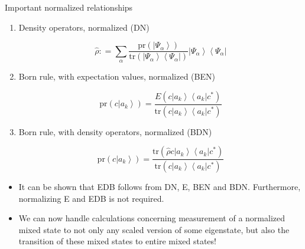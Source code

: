 \documentclass[9pt,handout]{beamer}
\newcommand{\pr}[0]{\text{pr}}
\newcommand{\tr}[0]{\text{tr}}
\begin{document}
\begin{frame}{}
\begin{block}{Important normalized relationships}
\begin{enumerate}
\item Density operators, normalized (DN)

$$\widehat{\rho} : = \sum_\alpha \frac{\pr \left( \left\lvert \Psi_\alpha \right\rangle \right)}{\tr \left( \left\lvert \Psi_\alpha \right\rangle \left\langle \Psi_\alpha \right\rvert \right)} \left\lvert \Psi_\alpha \right\rangle \left\langle \Psi_\alpha \right\rvert$$

\item Born rule, with expectation values, normalized (BEN)

$$\pr \left( c \left\lvert a_k \right\rangle \right) = \frac{E \left( c \left\lvert a_k \right\rangle \left\langle a_k \right\rvert c^* \right)}{\tr \left( c \left\lvert a_k \right\rangle \left\langle a_k \right\rvert c^* \right)}$$

\item Born rule, with density operators, normalized (BDN)

$$\pr \left( c \left\lvert a_k \right\rangle \right) = \frac{\tr \left( \widehat{\rho} c \left\lvert a_k \right\rangle \left\langle a_k \right\rvert c^* \right)}{\tr \left( c \left\lvert a_k \right\rangle \left\langle a_k \right\rvert c^* \right)}$$
\end{enumerate}
\end{block}

\begin{itemize}
\item It can be shown that EDB follows from DN, E, BEN and BDN. Furthermore, normalizing E and EDB is not required.

\item We can now handle calculations concerning measurement of a normalized mixed state to not only any scaled version of some eigenstate, but also the transition of these mixed states to entire mixed states!
\end{itemize}
\end{frame}
\end{document}
